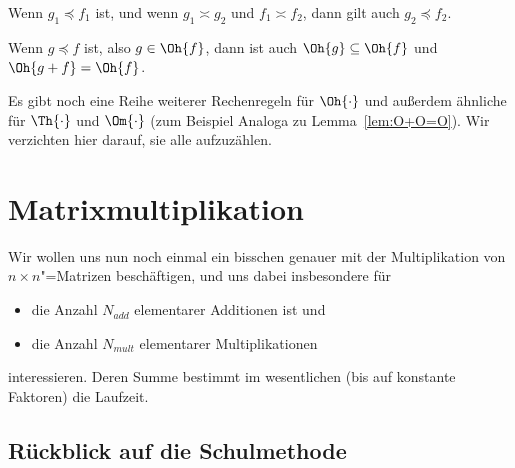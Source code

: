 %
\begin{punkt}[Rechenregel]
  Wenn $g_1\preceq f_1$ ist, und wenn $g_1\asymp g_2$ und $f_1\asymp
  f_2$, dann gilt auch $g_2\preceq f_2$.
\end{punkt}

\begin{punkt}[Rechenregel]
  Wenn $g\preceq f$ ist, also $g\in\Oh{f}$, dann ist auch
  $\Oh{g}\subseteq \Oh{f}$ und $\Oh{g+f}=\Oh{f}$.
\end{punkt}
%
Es gibt noch eine Reihe weiterer Rechenregeln für $\Oh{\cdot}$ und
außerdem ähnliche für $\Th{\cdot}$ und $\Om{\cdot}$ (zum Beispiel
Analoga zu Lemma~\ref{lem:O+O=O}). Wir verzichten hier darauf, sie
alle aufzuzählen.

\Tut\section{Matrixmultiplikation}
\label{sec:matmult}

\def\Nadd{N_{\mathit{add}}}
\def\Nmult{N_{\mathit{mult}}}

Wir wollen uns nun noch einmal ein bisschen genauer mit der
Multiplikation von $n\times n$"=Matrizen beschäftigen, und uns dabei
insbesondere für
\begin{itemize}
\item die Anzahl $\Nadd$ elementarer Additionen ist und
\item die Anzahl $\Nmult$ elementarer Multiplikationen
\end{itemize}
%
interessieren. Deren Summe bestimmt im wesentlichen (\dh bis auf
konstante Faktoren) die Laufzeit.

\Tut\subsection{R\"uckblick auf die Schulmethode}
\label{subsec:matmult-schulmethode}

